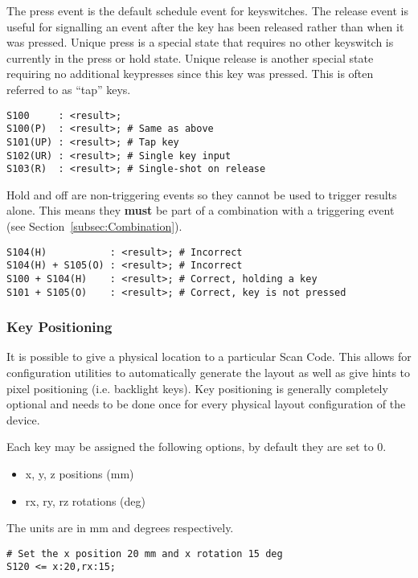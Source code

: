 \documentclass{kiibohd-template}
\begin{document}
The press event is the default schedule event for keyswitches.
The release event is useful for signalling an event after the key has been released rather than when it was pressed.
Unique press is a special state that requires no other keyswitch is currently in the press or hold state.
Unique release is another special state requiring no additional keypresses since this key was pressed.
This is often referred to as ``tap'' keys.

\begin{lstlisting}
S100     : <result>;
S100(P)  : <result>; # Same as above
S101(UP) : <result>; # Tap key
S102(UR) : <result>; # Single key input
S103(R)  : <result>; # Single-shot on release
\end{lstlisting}

Hold and off are non-triggering events so they cannot be used to trigger results alone.
This means they \textbf{must} be part of a combination with a triggering event (see Section~\ref{subsec:Combination}).

\begin{lstlisting}
S104(H)           : <result>; # Incorrect
S104(H) + S105(O) : <result>; # Incorrect
S100 + S104(H)    : <result>; # Correct, holding a key
S101 + S105(O)    : <result>; # Correct, key is not pressed
\end{lstlisting}


\subsubsection{Key Positioning}
\label{subsubsec:keypositioning}

It is possible to give a physical location to a particular Scan Code.
This allows for configuration utilities to automatically generate the layout as well as give hints to pixel positioning (i.e. backlight keys).
Key positioning is generally completely optional and needs to be done once for every physical layout configuration of the device.

Each key may be assigned the following options, by default they are set to 0.

\begin{itemize}
\item x, y, z positions (mm)
\item rx, ry, rz rotations (deg)
\end{itemize}

The units are in mm and degrees respectively.

\begin{lstlisting}
# Set the x position 20 mm and x rotation 15 deg
S120 <= x:20,rx:15;
\end{lstlisting}
\end{document}
